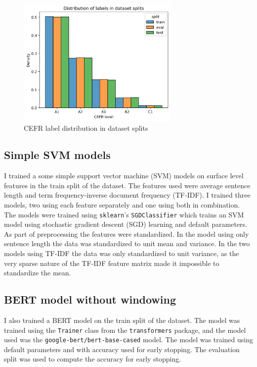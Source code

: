 \documentclass[11pt,a4paper]{article}
\begin{document}
\begin{figure}
  \centering
  \includegraphics[width=0.7\textwidth]{figures/split-distributions-full-texts.png}
  \caption{CEFR label distribution in dataset splits}
  \label{fig:dataset-splits-labels}
\end{figure}

\subsection{Simple SVM models}

I trained a some simple support vector machine (SVM) models on surface level features in the
train split of the dataset. The features used were average sentence length and
term frequency-inverse document frequency (TF-IDF). I trained three models, two
using each feature separately and one using both in combination. The models
were trained using \verb!sklearn!'s \verb!SGDClassifier! which trains an SVM
model using stochastic gradient descent (SGD) learning and default parameters. As part of
preprocessing the features were standardized. In the model using only sentence
length the data was standardized to unit mean and variance. In the two models
using TF-IDF the data was only standardized to unit variance, as the very
sparse nature of the TF-IDF feature matrix made it impossible to standardize
the mean.

\subsection{BERT model without windowing}

I also trained a BERT model on the train split of the dataset. The model was trained
using the \verb!Trainer! class from the \verb!transformers! package, and the
model used was the \verb!google-bert/bert-base-cased! model. The model was
trained using default parameters and with accuracy used for early stopping.
The evaluation split was used to compute the accuracy for early stopping.
\end{document}

